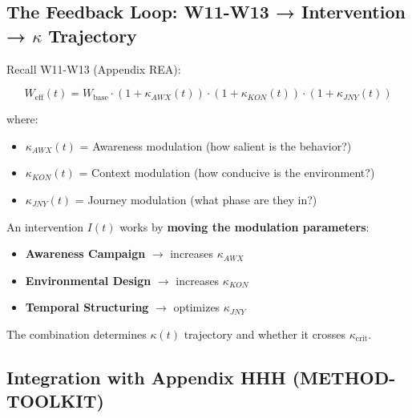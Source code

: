 \documentclass[11pt, a4paper]{article}
\begin{document}
\subsection{The Feedback Loop: W11-W13 → Intervention → $\kappa$ Trajectory}

Recall W11-W13 (Appendix REA):

\begin{equation}
W_{\text{eff}}(t) = W_{\text{base}} \cdot (1 + \kappa_{AWX}(t)) \cdot (1 + \kappa_{KON}(t)) \cdot (1 + \kappa_{JNY}(t))
\end{equation}

\noindent
where:
\begin{itemize}
    \item $\kappa_{AWX}(t)$ = Awareness modulation (how salient is the behavior?)
    \item $\kappa_{KON}(t)$ = Context modulation (how conducive is the environment?)
    \item $\kappa_{JNY}(t)$ = Journey modulation (what phase are they in?)
\end{itemize}

\noindent
An intervention $I(t)$ works by \textbf{moving the modulation parameters}:

\begin{itemize}
    \item \textbf{Awareness Campaign} $\to$ increases $\kappa_{AWX}$
    \item \textbf{Environmental Design} $\to$ increases $\kappa_{KON}$
    \item \textbf{Temporal Structuring} $\to$ optimizes $\kappa_{JNY}$
\end{itemize}

\noindent
The combination determines $\kappa(t)$ trajectory and whether it crosses $\kappa_{\text{crit}}$.

\subsection{Integration with Appendix HHH (METHOD-TOOLKIT)}
\label{sec:bb-hhh-integration}
\end{document}
